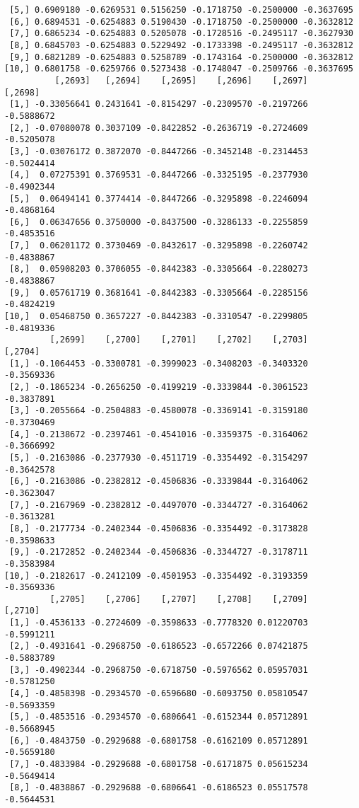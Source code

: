\documentclass[
  letterpaper,
  DIV=11,
  numbers=noendperiod]{scrreprt}
\begin{document}
\begin{verbatim}
 [5,] 0.6909180 -0.6269531 0.5156250 -0.1718750 -0.2500000 -0.3637695
 [6,] 0.6894531 -0.6254883 0.5190430 -0.1718750 -0.2500000 -0.3632812
 [7,] 0.6865234 -0.6254883 0.5205078 -0.1728516 -0.2495117 -0.3627930
 [8,] 0.6845703 -0.6254883 0.5229492 -0.1733398 -0.2495117 -0.3632812
 [9,] 0.6821289 -0.6254883 0.5258789 -0.1743164 -0.2500000 -0.3632812
[10,] 0.6801758 -0.6259766 0.5273438 -0.1748047 -0.2509766 -0.3637695
          [,2693]   [,2694]    [,2695]    [,2696]    [,2697]    [,2698]
 [1,] -0.33056641 0.2431641 -0.8154297 -0.2309570 -0.2197266 -0.5888672
 [2,] -0.07080078 0.3037109 -0.8422852 -0.2636719 -0.2724609 -0.5205078
 [3,] -0.03076172 0.3872070 -0.8447266 -0.3452148 -0.2314453 -0.5024414
 [4,]  0.07275391 0.3769531 -0.8447266 -0.3325195 -0.2377930 -0.4902344
 [5,]  0.06494141 0.3774414 -0.8447266 -0.3295898 -0.2246094 -0.4868164
 [6,]  0.06347656 0.3750000 -0.8437500 -0.3286133 -0.2255859 -0.4853516
 [7,]  0.06201172 0.3730469 -0.8432617 -0.3295898 -0.2260742 -0.4838867
 [8,]  0.05908203 0.3706055 -0.8442383 -0.3305664 -0.2280273 -0.4838867
 [9,]  0.05761719 0.3681641 -0.8442383 -0.3305664 -0.2285156 -0.4824219
[10,]  0.05468750 0.3657227 -0.8442383 -0.3310547 -0.2299805 -0.4819336
         [,2699]    [,2700]    [,2701]    [,2702]    [,2703]    [,2704]
 [1,] -0.1064453 -0.3300781 -0.3999023 -0.3408203 -0.3403320 -0.3569336
 [2,] -0.1865234 -0.2656250 -0.4199219 -0.3339844 -0.3061523 -0.3837891
 [3,] -0.2055664 -0.2504883 -0.4580078 -0.3369141 -0.3159180 -0.3730469
 [4,] -0.2138672 -0.2397461 -0.4541016 -0.3359375 -0.3164062 -0.3666992
 [5,] -0.2163086 -0.2377930 -0.4511719 -0.3354492 -0.3154297 -0.3642578
 [6,] -0.2163086 -0.2382812 -0.4506836 -0.3339844 -0.3164062 -0.3623047
 [7,] -0.2167969 -0.2382812 -0.4497070 -0.3344727 -0.3164062 -0.3613281
 [8,] -0.2177734 -0.2402344 -0.4506836 -0.3354492 -0.3173828 -0.3598633
 [9,] -0.2172852 -0.2402344 -0.4506836 -0.3344727 -0.3178711 -0.3583984
[10,] -0.2182617 -0.2412109 -0.4501953 -0.3354492 -0.3193359 -0.3569336
         [,2705]    [,2706]    [,2707]    [,2708]    [,2709]    [,2710]
 [1,] -0.4536133 -0.2724609 -0.3598633 -0.7778320 0.01220703 -0.5991211
 [2,] -0.4931641 -0.2968750 -0.6186523 -0.6572266 0.07421875 -0.5883789
 [3,] -0.4902344 -0.2968750 -0.6718750 -0.5976562 0.05957031 -0.5781250
 [4,] -0.4858398 -0.2934570 -0.6596680 -0.6093750 0.05810547 -0.5693359
 [5,] -0.4853516 -0.2934570 -0.6806641 -0.6152344 0.05712891 -0.5668945
 [6,] -0.4843750 -0.2929688 -0.6801758 -0.6162109 0.05712891 -0.5659180
 [7,] -0.4833984 -0.2929688 -0.6801758 -0.6171875 0.05615234 -0.5649414
 [8,] -0.4838867 -0.2929688 -0.6806641 -0.6186523 0.05517578 -0.5644531

\end{verbatim}
\end{document}
